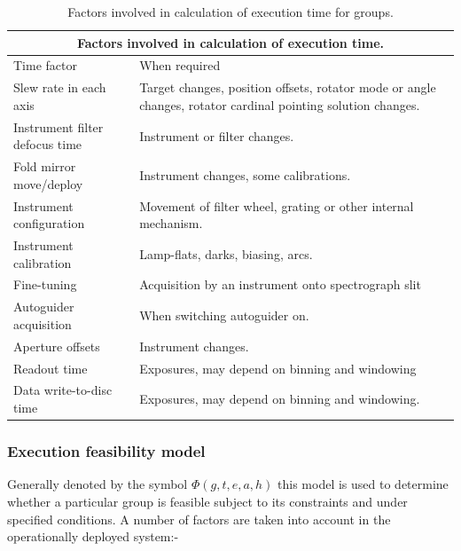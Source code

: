 \begin{table}[htbp]
\begin{center}
\begin{tabular}{lp{20em}}
\toprule
\multicolumn{2}{c}{Factors involved in calculation of execution time.} \\
\midrule
Time factor & When required \\
\midrule
Slew rate in each axis & Target changes, position offsets, rotator mode or angle changes, rotator cardinal pointing solution changes.\\
Instrument filter defocus time & Instrument or filter changes. \\
Fold mirror move/deploy & Instrument changes, some calibrations. \\
Instrument configuration & Movement of filter wheel, grating or other internal mechanism. \\
Instrument calibration & Lamp-flats, darks, biasing, arcs. \\
Fine-tuning & Acquisition by an instrument onto spectrograph slit \\
Autoguider acquisition & When switching autoguider on. \\
Aperture offsets & Instrument changes. \\
Readout time & Exposures, may depend on binning and windowing \\
Data write-to-disc time  & Exposures, may depend on binning and windowing. \\
\bottomrule
\end{tabular}
\end{center}
\caption[Factors involved in calculation of execution time for groups.]
{Factors involved in calculation of execution time for groups.}
\label{tab:exectime_factors}
\end{table}


\subsubsection{Execution feasibility model}
Generally denoted by the symbol $\Phi(g,t,e,a,h)$ this model is used to determine whether a particular group is feasible subject to its constraints and under specified conditions. A number of factors are taken into account in the operationally deployed system:-

